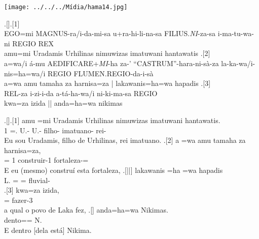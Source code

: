 \clearpage%


\begin{center}
	\texttt{[image: ../../../Mídia/hama14.jpg]}
\end{center}

\ex.[]\ag.[1]\LARGE {} \LARGE {}
\LARGE {} \LARGE {}
\LARGE {} \LARGE {}\\
EGO=mi MAGNUS-ra/i-da-mi-sa
u+ra-hi-li-na-sa FILIUS.\emph{NI}-za-sa
{i-ma-tu-wa-ni REGIO} REX\\
amu=mi Uradamis Urhilinas nimuwizas imatuwani hantawatis\vspace{10pt}
\bg.[2]\LARGE {} \LARGE {}
\LARGE {} \LARGE {}
\LARGE {}
\LARGE {}
\LARGE {}
\\
a=wa/i á-mu AEDIFICARE+\emph{MI}-ha za-' ``CASTRUM''-hara-ni-sà-za
{la-ka-wa/i-nis=ha=wa/i REGIO} FLUMEN.REGIO-da-i-sà\\
a=wa amu tamaha za harnisa=za | lakawanis=ha=wa hapadis\vspace{10pt}
\bg.[3]\LARGE {}
\LARGE {}
\LARGE {}
\LARGE {}
\\
REL-za i-zi-i-da a-tá-ha-wa/i {ni-ki-ma-sa REGIO}\\
kwa=za izida || anda=ha=wa nikimas

\clearpage%

\ex.[]\ag.[1] amu =mi Uradamis Urhilinas nimuwizas imatuwani hantawatis.\\
\Pro{}1\Sg{} =\Refl{}. U.-\Com{}\Nom{}\Sg{} U.-\Com{}\Gen{}\Sg{} filho-\Com{}\Nom{}\Sg{}
imatuano-\Com{}\Nom{}\Sg{} rei-\Com{}\Nom{}\Sg{}\\
Eu sou Uradamis, filho de Urhilinas, rei imatuano.
\bg.[2] a =wa amu tamaha za harnisa=za,\\
\Conj{} =\Clt{} \Pro{}1\Sg{} construir-1\Sg{}\Pret{} \Pro{}\Neut{}\Acu{}\Sg{}
fortaleza-\Neut{}\Acu{}\Sg{}=\Clt{}\\
E eu (mesmo) construí esta fortaleza,
\bg.[||] lakawanis =ha =wa hapadis\\
L.\Com{}\Nom{}\Sg{} =\Conj{} =\Clt{} fluvial-\Com{}\Nom{}\Sg{}\\
\bg.[3] kwa=za izida,\\
\Rel{}\Neut{}\Acu{}\Sg{}=\Clt{} fazer-3\Sg{}\Pret{}\\
a qual o povo de Laka fez,
\bg.[] anda=ha=wa Nikimas.\\
dento=\Conj{}=\Clt{} N.\Com{}\Nom{}\Sg{}\\
E dentro [dela está] Nikima.

